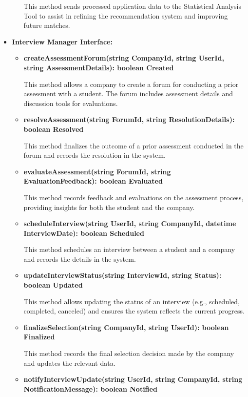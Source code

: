 \begin{itemize}
\begin{itemize}
    This method sends processed application data to the Statistical Analysis Tool to assist in refining the recommendation system and improving future matches.
    \end{itemize}

\item \textbf{Interview Manager Interface:}
\begin{itemize}
    \item \textbf{createAssessmentForum(string CompanyId, string UserId, string AssessmentDetails): boolean Created}

    This method allows a company to create a forum for conducting a prior assessment with a student. The forum includes assessment details and discussion tools for evaluations.

    \item \textbf{resolveAssessment(string ForumId, string ResolutionDetails): boolean Resolved}

    This method finalizes the outcome of a prior assessment conducted in the forum and records the resolution in the system.

    \item \textbf{evaluateAssessment(string ForumId, string EvaluationFeedback): boolean Evaluated}

    This method records feedback and evaluations on the assessment process, providing insights for both the student and the company.
    
    \item \textbf{scheduleInterview(string UserId, string CompanyId, datetime InterviewDate): boolean Scheduled}

    This method schedules an interview between a student and a company and records the details in the system.

    \item \textbf{updateInterviewStatus(string InterviewId, string Status): boolean Updated}

    This method allows updating the status of an interview (e.g., scheduled, completed, canceled) and ensures the system reflects the current progress.

    \item \textbf{finalizeSelection(string CompanyId, string UserId): boolean Finalized}

    This method records the final selection decision made by the company and updates the relevant data.

    \item \textbf{notifyInterviewUpdate(string UserId, string CompanyId, string NotificationMessage): boolean Notified}


\end{itemize}
\end{itemize}
